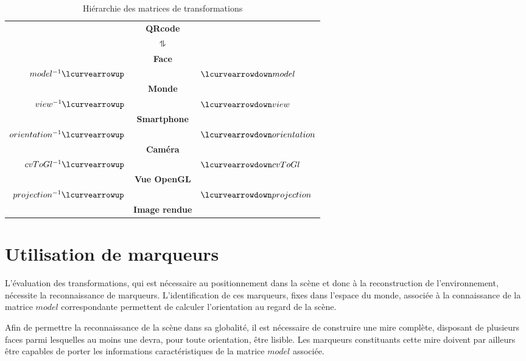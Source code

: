 \documentclass[10pt,a4paper,twoside, twocolumn]{report}
\begin{document}
\begin{table}[!ht]
	\centering
	\begin{tabular}{rcl}
																			& \textbf{QRcode}				&																\\[.2cm]
		$ $																& $\updownharpoons$			& $ $														\\[.2cm]
																			& \textbf{Face}					&																\\[.2cm]
		$model^{-1}				\lcurvearrowup$	&												& $\lcurvearrowdown model$			\\[.2cm]
																			& \textbf{Monde}				&																\\[.2cm]
		$view^{-1}				\lcurvearrowup$	& 											& $\lcurvearrowdown view$				\\[.2cm]
																			& \textbf{Smartphone}		&																\\[.2cm]
		$orientation^{-1}	\lcurvearrowup$	& 											& $\lcurvearrowdown orientation$\\[.2cm]
																			& \textbf{Caméra}				&																\\[.2cm]
		$cvToGl^{-1}			\lcurvearrowup$	& 											& $\lcurvearrowdown cvToGl $		\\[.2cm]
																			& \textbf{Vue OpenGL}		&																\\[.2cm]
		$projection^{-1}	\lcurvearrowup$	&												& $\lcurvearrowdown projection$	\\[.2cm]
																			& \textbf{Image rendue}	&
	\end{tabular}
	\caption{Hiérarchie des matrices de transformations}
	\label{ref:table:hierarchie}
\end{table}



\section{Utilisation de marqueurs}

L’évaluation des transformations, qui est nécessaire au positionnement dans la scène et donc à la reconstruction de l’environnement, nécessite la reconnaissance de marqueurs. L’identification de ces marqueurs, fixes dans l’espace du monde, associée à la connaissance de la matrice $model$ correspondante permettent de calculer l’orientation au regard de la scène.

Afin de permettre la reconnaissance de la scène dans sa globalité, il est nécessaire de construire une mire complète, disposant de plusieurs faces parmi lesquelles au moins une devra, pour toute orientation, être lisible. Les marqueurs constituants cette mire doivent par ailleurs être capables de porter les informations caractéristiques de la matrice $model$ associée.
\end{document}
